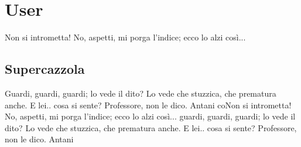 \section{\huge{User}}
Non si intrometta! No, aspetti, mi porga l'indice; ecco lo alzi così... 

\subsection{Supercazzola}
Guardi, guardi, guardi; lo vede il dito? Lo vede che stuzzica, che prematura anche. E lei.. cosa si sente? Professore, non le dico. Antani coNon si intrometta! No, aspetti, mi porga l'indice; ecco lo alzi così... guardi, guardi, guardi; lo vede il dito? Lo vede che stuzzica, che prematura anche. E lei.. cosa si sente? Professore, non le dico. Antani